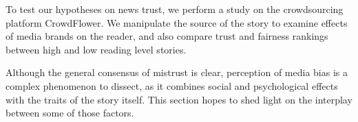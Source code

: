 To test our hypotheses on news trust, we perform a study on the crowdsourcing platform CrowdFlower. We manipulate the source of the story to examine effects of media brands on the reader, and also compare trust and fairness rankings between high and low reading level stories.



Although the general consensus of mistrust is clear, perception of media bias is a complex phenomenon to dissect, as it combines social and psychological effects with the traits of the story itself. This section hopes to shed light on the interplay between some of those factors.

%  